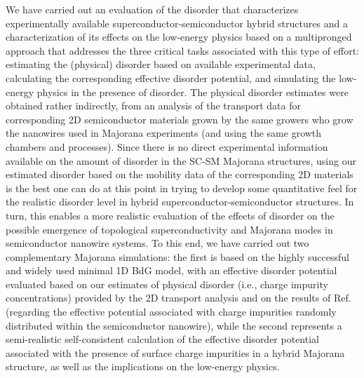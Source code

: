 \documentclass[aps,prmaterials,twocolumn,superscriptaddress,longbibliography]{revtex4-2}
\begin{document}
We have carried out an evaluation of the disorder that characterizes experimentally available superconductor-semiconductor hybrid structures and a characterization of its effects on the low-energy physics based on a multipronged approach that addresses the three critical tasks associated with this type of effort: estimating the (physical) disorder based on available experimental data, calculating the corresponding effective disorder potential, and simulating the low-energy physics in the presence of disorder. The physical disorder estimates were obtained rather indirectly, from an analysis of the transport data for corresponding 2D semiconductor materials grown by the same growers who grow the nanowires used in Majorana experiments (and using the same growth chambers and processes).  Since there is no direct experimental information available on the amount of disorder in the SC-SM Majorana structures, using our estimated disorder based on the mobility data of the corresponding 2D materials is the best one can do at this point in trying to develop some quantitative feel for the realistic disorder level in hybrid superconductor-semiconductor structures. In turn,  this enables a more realistic evaluation of the effects of disorder on the possible emergence of topological superconductivity and Majorana modes in semiconductor nanowire systems.  To this end,  we have carried out two complementary Majorana simulations: the first is based on the highly successful and widely used minimal 1D BdG model, with an effective disorder potential evaluated based on our estimates of physical disorder (i.e., charge impurity concentrations) provided by the 2D transport analysis and on the results of Ref.  (regarding the effective potential associated with charge impurities randomly distributed within the semiconductor nanowire), while the second represents a semi-realistic self-consistent calculation of the effective disorder potential associated with the presence of surface charge impurities in a hybrid Majorana structure, as well as the implications on the low-energy physics. 
\end{document}
